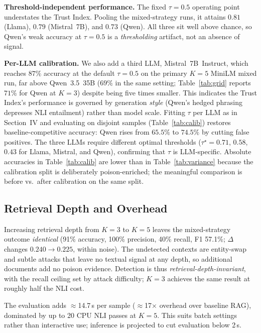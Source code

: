 \textbf{Threshold-independent performance.} The fixed $\tau{=}0.5$ operating point understates the Trust Index. Pooling the mixed-strategy runs, it attains  $0.81$ (Llama), $0.79$ (Mistral~7B), and $0.73$ (Qwen). All three sit well above chance, so Qwen's weak accuracy at $\tau{=}0.5$ is a \emph{thresholding} artifact, not an absence of signal.

\textbf{Per-LLM calibration.} We also add a third LLM, Mistral~7B~Instruct, which reaches $87\%$ accuracy at the default $\tau{=}0.5$ on the primary $K{=}5$ MiniLM mixed run, far above Qwen~3.5~35B ($69\%$ in the same setting; Table~\ref{tab:grid} reports $71\%$ for Qwen at $K{=}3$) despite being five times smaller. This indicates the Trust Index's performance is governed by generation \emph{style} (Qwen's hedged phrasing depresses NLI entailment) rather than model scale. Fitting $\tau$ per LLM as in Section~IV and evaluating on disjoint samples (Table~\ref{tab:calib}) restores baseline-competitive accuracy: Qwen rises from $65.5\%$ to $74.5\%$ by cutting false positives. The three LLMs require different optimal thresholds ($\tau^\star{=}0.71$, $0.58$, $0.43$ for Llama, Mistral, and Qwen), confirming that $\tau$ is LLM-specific. Absolute accuracies in Table~\ref{tab:calib} are lower than in Table~\ref{tab:variance} because the calibration split is deliberately poison-enriched; the meaningful comparison is before vs.\ after calibration on the same split.

\subsection{Retrieval Depth and Overhead}
Increasing retrieval depth from $K{=}3$ to $K{=}5$ leaves the mixed-strategy outcome \emph{identical} (91\% accuracy, 100\% precision, 40\% recall, F1 57.1\%; $\Delta$ changes $0.240\!\to\!0.225$, within noise). The undetected contexts are entity-swap and subtle attacks that leave no textual signal at any depth, so additional documents add no poison evidence. Detection is thus \emph{retrieval-depth-invariant}, with the recall ceiling set by attack difficulty; $K{=}3$ achieves the same result at roughly half the NLI cost.

The evaluation adds $\approx$14.7\,s per sample ($\approx$17$\times$ overhead over baseline RAG), dominated by up to 20 CPU NLI passes at $K{=}5$. This suits batch settings rather than interactive use;  inference is projected to cut evaluation below 2\,s. 

